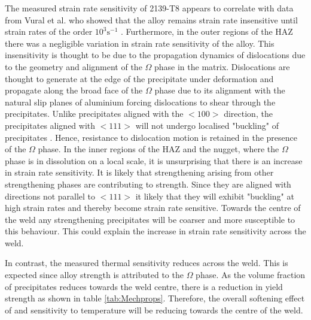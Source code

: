 The measured strain rate sensitivity of 2139-T8 appears to correlate with data from Vural et al. who showed that the alloy remains strain rate insensitive until strain rates of the order $10^3\text{s}^{-1}$ \cite{Vural2009}. Furthermore, in the outer regions of the HAZ there was a negligible variation in strain rate sensitivity of the alloy. This insensitivity is thought to be due to the propagation dynamics of dislocations due to the geometry and alignment of the $\Omega$ phase in the matrix. Dislocations are thought to generate at the edge of the precipitate under deformation and propagate along the broad face of the $\Omega$ phase due to its alignment with the natural slip planes of aluminium forcing dislocations to shear through the precipitates. Unlike precipitates aligned with the $<100>$ direction, the precipitates aligned with $<111>$ will not undergo localised "buckling" of precipitates \cite{Elkhodary2010,Elkhodary2011b,Casem2009}. Hence, resistance to dislocation motion is retained in the presence of the $\Omega$ phase. In the inner regions of the HAZ and the nugget, where the $\Omega$ phase is in dissolution on a local scale, it is unsurprising that there is an increase in strain rate sensitivity. It is likely that strengthening arising from other strengthening phases are contributing to strength. Since they are aligned with directions not parallel to $<111>$ it likely that they will exhibit "buckling" at high strain rates and thereby become strain rate sensitive. Towards the centre of the weld any strengthening precipitates will be coarser and more susceptible to this behaviour. This could explain the increase in strain rate sensitivity across the weld.

In contrast, the measured thermal sensitivity reduces across the weld. This is expected since alloy strength is attributed to the $\Omega$ phase. As the volume fraction of precipitates reduces towards the weld centre, there is a reduction in yield strength as shown in table \ref{tab:Mechprops}. Therefore, the overall softening effect of and sensitivity to temperature will be reducing towards the centre of the weld.
	
